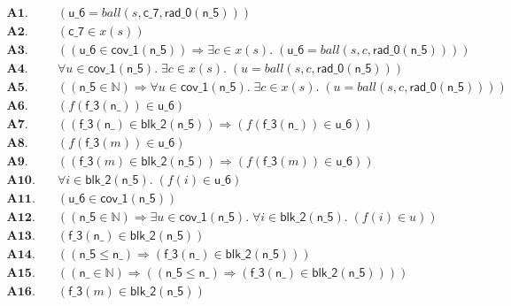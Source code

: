 \documentclass[11pt]{article}
\begin{document}
\begin{align*}
  \mathbf{A1.}\quad & (\mathsf{u\_6} = \mathit{ball}(s, \mathsf{c\_7}, \mathsf{rad\_0}(\mathsf{n\_5}))) \\
  \mathbf{A2.}\quad & (\mathsf{c\_7} \in x(s)) \\
  \mathbf{A3.}\quad & ((\mathsf{u\_6} \in \mathsf{cov\_1}(\mathsf{n\_5})) \Rightarrow \exists c \in x(s).\; (\mathsf{u\_6} = \mathit{ball}(s, c, \mathsf{rad\_0}(\mathsf{n\_5})))) \\
  \mathbf{A4.}\quad & \forall u \in \mathsf{cov\_1}(\mathsf{n\_5}).\; \exists c \in x(s).\; (u = \mathit{ball}(s, c, \mathsf{rad\_0}(\mathsf{n\_5}))) \\
  \mathbf{A5.}\quad & ((\mathsf{n\_5} \in \mathbb{N}) \Rightarrow \forall u \in \mathsf{cov\_1}(\mathsf{n\_5}).\; \exists c \in x(s).\; (u = \mathit{ball}(s, c, \mathsf{rad\_0}(\mathsf{n\_5})))) \\
  \mathbf{A6.}\quad & (f(\mathsf{f\_3}(\mathsf{n\_})) \in \mathsf{u\_6}) \\
  \mathbf{A7.}\quad & ((\mathsf{f\_3}(\mathsf{n\_}) \in \mathsf{blk\_2}(\mathsf{n\_5})) \Rightarrow (f(\mathsf{f\_3}(\mathsf{n\_})) \in \mathsf{u\_6})) \\
  \mathbf{A8.}\quad & (f(\mathsf{f\_3}(m)) \in \mathsf{u\_6}) \\
  \mathbf{A9.}\quad & ((\mathsf{f\_3}(m) \in \mathsf{blk\_2}(\mathsf{n\_5})) \Rightarrow (f(\mathsf{f\_3}(m)) \in \mathsf{u\_6})) \\
  \mathbf{A10.}\quad & \forall i \in \mathsf{blk\_2}(\mathsf{n\_5}).\; (f(i) \in \mathsf{u\_6}) \\
  \mathbf{A11.}\quad & (\mathsf{u\_6} \in \mathsf{cov\_1}(\mathsf{n\_5})) \\
  \mathbf{A12.}\quad & ((\mathsf{n\_5} \in \mathbb{N}) \Rightarrow \exists u \in \mathsf{cov\_1}(\mathsf{n\_5}).\; \forall i \in \mathsf{blk\_2}(\mathsf{n\_5}).\; (f(i) \in u)) \\
  \mathbf{A13.}\quad & (\mathsf{f\_3}(\mathsf{n\_}) \in \mathsf{blk\_2}(\mathsf{n\_5})) \\
  \mathbf{A14.}\quad & ((\mathsf{n\_5} \leq \mathsf{n\_}) \Rightarrow (\mathsf{f\_3}(\mathsf{n\_}) \in \mathsf{blk\_2}(\mathsf{n\_5}))) \\
  \mathbf{A15.}\quad & ((\mathsf{n\_} \in \mathbb{N}) \Rightarrow ((\mathsf{n\_5} \leq \mathsf{n\_}) \Rightarrow (\mathsf{f\_3}(\mathsf{n\_}) \in \mathsf{blk\_2}(\mathsf{n\_5})))) \\
  \mathbf{A16.}\quad & (\mathsf{f\_3}(m) \in \mathsf{blk\_2}(\mathsf{n\_5})) \\

\end{align*}
\end{document}
